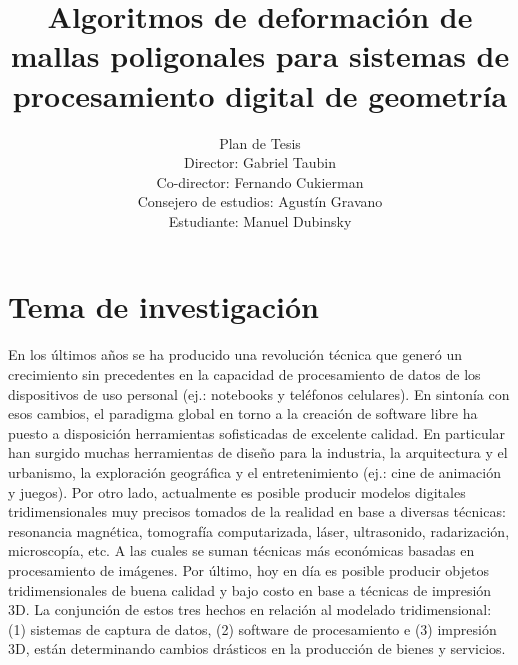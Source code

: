\documentclass{article}
\title{Algoritmos de deformación de mallas poligonales para sistemas de 
procesamiento digital de geometría}
\author{Plan de Tesis\\
        Director: Gabriel Taubin\\
        Co-director: Fernando Cukierman\\
        Consejero de estudios: Agustín Gravano\\
        Estudiante: Manuel Dubinsky}
\begin{document}


\maketitle




\section{Tema de investigación}
En los últimos años se ha producido una revolución técnica que generó un 
crecimiento sin precedentes en la capacidad de procesamiento de datos de 
los dispositivos de uso personal (ej.: notebooks y teléfonos celulares). 
En sintonía con esos cambios, el paradigma global en torno a la creación de 
software libre ha puesto a disposición herramientas sofisticadas de 
excelente calidad. En particular han surgido muchas herramientas de diseño 
para la industria, la arquitectura y el urbanismo, la exploración geográfica y 
el entretenimiento (ej.: cine de animación y juegos). Por otro 
lado, actualmente es posible producir modelos digitales 
tridimensionales muy precisos tomados de la realidad en base a diversas 
técnicas: resonancia magnética, tomografía computarizada, láser, 
ultrasonido, radarización, microscopía, etc. A las cuales se suman técnicas 
más económicas basadas en procesamiento de imágenes. 
Por último, hoy en día es posible producir objetos tridimensionales de 
buena calidad y bajo costo en base a técnicas de impresión 3D. La conjunción 
de estos tres hechos en relación al modelado tridimensional: (1) sistemas de 
captura de datos, (2) software de procesamiento e (3) impresión 3D, están determinando 
cambios drásticos en la producción de bienes y servicios.
\end{document}
